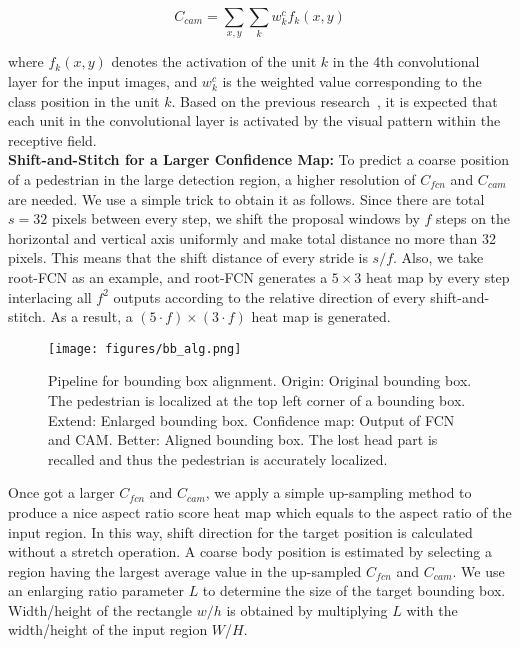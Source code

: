 \documentclass[journal]{IEEEtran}
\begin{document}
\begin{equation}
 C_{cam} = \sum_{x,y}\sum_{k}w_{k}^{c}f_{k}(x,y)
\end{equation}

where $f_{k}(x,y)$ denotes the activation of the unit $k$ in the 4th convolutional layer for the input images, and $w_{k}^{c}$ is the weighted value corresponding to the class position in the unit $k$. Based on the previous research~\cite{zhou2016learning}, it is expected that each unit in the convolutional layer is activated by the visual pattern within the receptive field. \\

 \textbf{Shift-and-Stitch for a Larger Confidence Map:} To predict a coarse position of a pedestrian in the large detection region, a higher resolution of $C_{fcn}$ and $C_{cam}$ are needed. We use a simple trick to obtain it as follows. Since there are total $s=32$ pixels between every step, we shift the proposal windows by $f$ steps on the horizontal and vertical axis uniformly and make total distance no more than 32 pixels. This means that the shift distance of every stride is $s/f$. Also, we take root-FCN as an example, and root-FCN generates a $5 \times 3$ heat map by every step interlacing all $f^{2}$ outputs according to the relative direction of every shift-and-stitch. As a result, a $(5\cdot{f})\times(3\cdot{f})$ heat map is generated.

 \begin{figure*}[t]
\centering
\centerline{\texttt{[image: figures/bb\_alg.png]}}
\caption{Pipeline for bounding box alignment. Origin: Original bounding box. The pedestrian is localized at the top left corner of a bounding box. Extend: Enlarged bounding box. Confidence map: Output of FCN and CAM. Better: Aligned bounding box. The lost head part is recalled and thus the pedestrian is accurately localized. }
\label{fig:example}
\end{figure*}

Once got a larger $C_{fcn}$ and $C_{cam}$, we apply a simple up-sampling method to produce a nice aspect ratio score heat map which equals to the aspect ratio of the input region. In this way, shift direction for the target position is calculated without a stretch operation. A coarse body position is estimated by selecting a region having the largest average value in the up-sampled $C_{fcn}$ and $C_{cam}$. We use an enlarging ratio parameter $L$ to determine the size of the target bounding box. Width/height of the rectangle $w/h$ is obtained by multiplying $L$ with the width/height of the input region $W$/$H$.
\end{document}
